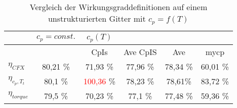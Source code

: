 \begin{table}[H]
	\centering
	\caption{Vergleich der Wirkungsgraddefinitionen auf einem unstrukturierten Gitter mit $c_p = f(T)$}
	\begin{tabular}{ l| c | c c c c}
		&	$c_p = const.$	&	$c_p(T)$	&		&		&		\\
		\hline
		&		&	CpIs	&	Ave CpIS	&	Ave	&	mycp	\\
		\hline
		$\eta_{CFX}$	&	80,21 \%	&	71,93 \%	&	77,96 \%	&	78,34 \%	&	60,01 \%	\\
		$\eta_{c_p, T_t}$	&	80,1 \%	&	\textcolor{red}{100,36} \%	&	78,23 \%	&	78,61\%	&	83,72 \%	\\
		$\eta_{torque}$	&	79,5 \%	&	70,23 \%	&	77,1 \%	&	77,48 \%	&	59,36 \%	\\
		
	\end{tabular}
	\label{tab:unstrukturiertmycp}
\end{table}
